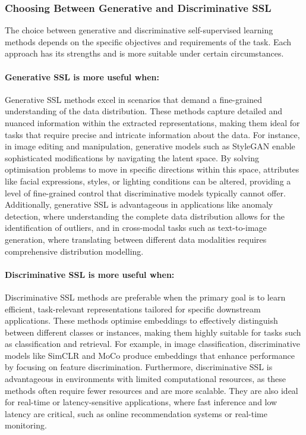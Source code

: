 \subsubsection{Choosing Between Generative and Discriminative SSL}

The choice between generative and discriminative self-supervised learning methods depends on the specific objectives and requirements of the task. Each approach has its strengths and is more suitable under certain circumstances.

\paragraph{Generative SSL is more useful when:}

Generative SSL methods excel in scenarios that demand a fine-grained understanding of the data distribution. These methods capture detailed and nuanced information within the extracted representations, making them ideal for tasks that require precise and intricate information about the data. For instance, in image editing and manipulation, generative models such as StyleGAN \citep{karras2019style, karras2020analyzing} enable sophisticated modifications by navigating the latent space. By solving optimisation problems to move in specific directions within this space, attributes like facial expressions, styles, or lighting conditions can be altered, providing a level of fine-grained control that discriminative models typically cannot offer. Additionally, generative SSL is advantageous in applications like anomaly detection, where understanding the complete data distribution allows for the identification of outliers, and in cross-modal tasks such as text-to-image generation, where translating between different data modalities requires comprehensive distribution modelling.

\paragraph{Discriminative SSL is more useful when:}

Discriminative SSL methods are preferable when the primary goal is to learn efficient, task-relevant representations tailored for specific downstream applications. These methods optimise embeddings to effectively distinguish between different classes or instances, making them highly suitable for tasks such as classification and retrieval. For example, in image classification, discriminative models like SimCLR \citep{chen2020simple} and MoCo \citep{he2020momentum} produce embeddings that enhance performance by focusing on feature discrimination. Furthermore, discriminative SSL is advantageous in environments with limited computational resources, as these methods often require fewer resources and are more scalable. They are also ideal for real-time or latency-sensitive applications, where fast inference and low latency are critical, such as online recommendation systems or real-time monitoring.

